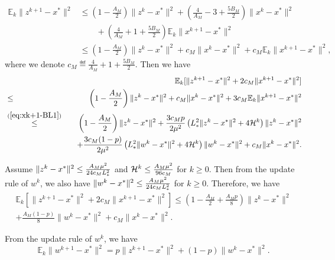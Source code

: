 \documentclass[11pt]{article}
\begin{document}
	\begin{align}
		\mathbb{E}_k\|z^{k+1}-x^*\|^2
		& \leq \left(  1 - \frac{A_M}{2}  \right) \|z^k-x^*\|^2 + \left(  \frac{4}{A_M} - 3 + \frac{5B_M}{2}  \right) \|x^k-x^*\|^2 \nonumber  \\ 
		& \qquad + \left(  \frac{4}{A_M} + 1 + \frac{5B_M}{2}  \right) \mathbb{E}_k\|x^{k+1}-x^*\|^2 \nonumber \\
		& \leq \left(  1 - \frac{A_M}{2}  \right) \|z^k-x^*\|^2 + c_M \|x^k-x^*\|^2  + c_M \mathbb{E}_k\|x^{k+1}-x^*\|^2, \label{eq:zk+1nbor-3PcBL1}
	\end{align}
	where we denote $c_M \eqdef  \frac{4}{A_M} + 1 + \frac{5B_M}{2}$. Then we have 
	\begin{eqnarray*}
		&& \mathbb{E}_k [\|z^{k+1}-x^*\|^2 + 2c_M \|x^{k+1}-x^*\|^2 ] \\
		&\leq& \left(  1 - \frac{A_M}{2}  \right) \|z^k-x^*\|^2 + c_M \|x^k-x^*\|^2  +  3c_M \mathbb{E}_k\|x^{k+1}-x^*\|^2 \\ 
		&\overset{(\ref{eq:xk+1-BL1})}{\leq}&  \left(  1 - \frac{A_M}{2}  \right) \|z^k-x^*\|^2  + \frac{3c_Mp}{2\mu^2} \left(  L_{*}^2 \|z^k-x^*\|^2 + 4 {\cal H}^k  \right) \|z^k-x^*\|^2 \\ 
		&& \quad + \frac{3c_M(1-p)}{2\mu^2} \left(  L_{*}^2 \|w^k-x^*\|^2 + 4 {\cal H}^k  \right) \|w^k-x^*\|^2 + c_M \|x^k-x^*\|^2. 
	\end{eqnarray*}
	
	Assume $\|z^k-x^*\|^2 \leq \frac{A_M \mu^2}{24c_M L_{*}^2}$ and ${\cal H}^k \leq \frac{A_M \mu^2}{96c_M}$ for $k\geq 0$. Then from the update rule of $w^k$, we also have  $\|w^k-x^*\|^2 \leq \frac{A_M \mu^2}{24c_M L_{*}^2}$ for $k\geq 0$. Therefore, we have 
	\begin{multline}\label{eq:zk+1-3PcBL1}
		\mathbb{E}_k [\|z^{k+1}-x^*\|^2 + 2c_M \|x^{k+1}-x^*\|^2 ] \leq \left(  1 - \frac{A_M}{2} + \frac{A_M p}{8}  \right) \|z^k-x^*\|^2 \\ + \frac{A_M (1-p)}{8} \|w^k-x^*\|^2 + c_M \|x^k-x^*\|^2. 
	\end{multline}
	
	From the update rule of $w^k$, we have 
	\begin{equation}\label{eq:wk+1-3PcBL1}
		\mathbb{E}_k\|w^{k+1} - x^*\|^2 = p\|z^{k+1}-x^*\|^2 + (1-p) \|w^k-x^*\|^2. 
	\end{equation}
	
\end{document}
